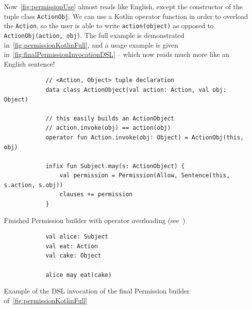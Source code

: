 Now~\autoref{fig:permissionUse} almost reads like English, except the constructor of the tuple class \texttt{ActionObj}.
We can use a Kotlin operator function in order to overload the \texttt{Action}, so the user is able to write \texttt{action(object)} as opposed to \texttt{ActionObj(action, obj)}.
The full example is demonstrated in~\autoref{fig:permissionKotlinFull}, and a usage example is given in~\autoref{fig:finalPermissionInvocationDSL} -- which now reads much more like an English sentence!


\begin{listing}[h]
    \centering
    \begin{minipage}{\textwidth}
        \begin{verbatim}
            // <Action, Object> tuple declaration
            data class ActionObject(val action: Action, val obj: Object)

            // this easily builds an ActionObject
            // action.invoke(obj) == action(obj)
            operator fun Action.invoke(obj: Object) = ActionObj(this, obj)

            infix fun Subject.may(s: ActionObject) {
                val permission = Permission(Allow, Sentence(this, s.action, s.obj))
                clauses += permission
            }
        \end{verbatim}
    \end{minipage}
    \caption[Finished Permission builder]{Finished Permission builder with operator overloading (see~\cite{kotlinInvokeOperator})}
    \label{fig:permissionKotlinFull}
\end{listing}



\begin{listing}[h]
    \centering
    \begin{minipage}{0.5\textwidth}
        \begin{verbatim}
            val alice: Subject
            val eat: Action
            val cake: Object

            alice may eat(cake)
        \end{verbatim}
    \end{minipage}
    \caption{Example of the DSL invocation of the final Permission builder of~\autoref{fig:permissionKotlinFull}}
    \label{fig:finalPermissionInvocationDSL}
\end{listing}


